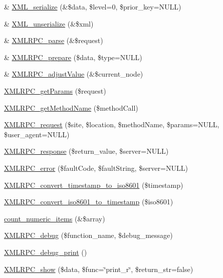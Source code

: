 \begin{CompactItemize}
\item 
\& \hyperlink{xmlrpc_8inc_a1e9b05a06f28fabb86c10129f5890ef}{XML\_\-serialize} (\&\$data, \$level=0, \$prior\_\-key=NULL)
\item 
\& \hyperlink{xmlrpc_8inc_ef8f3de498a12b230d049cdee6a25145}{XML\_\-unserialize} (\&\$xml)
\item 
\& \hyperlink{xmlrpc_8inc_708b2136ca600664d2207a511b3cf3f8}{XMLRPC\_\-parse} (\&\$request)
\item 
\& \hyperlink{xmlrpc_8inc_c13be54b26e0803d8745e4f019dcfd8a}{XMLRPC\_\-prepare} (\$data, \$type=NULL)
\item 
\& \hyperlink{xmlrpc_8inc_d936fe41ae9c3e0b90bd72ffe82a2969}{XMLRPC\_\-adjustValue} (\&\$current\_\-node)
\item 
\hyperlink{xmlrpc_8inc_ce4ea8e1274ca2ee3f51ec5a724f00f3}{XMLRPC\_\-getParams} (\$request)
\item 
\hyperlink{xmlrpc_8inc_70efa062e92a380196ed8053850c0906}{XMLRPC\_\-getMethodName} (\$methodCall)
\item 
\hyperlink{xmlrpc_8inc_3a98b6984b8ca01752d1aa9a267526a3}{XMLRPC\_\-request} (\$site, \$location, \$methodName, \$params=NULL, \$user\_\-agent=NULL)
\item 
\hyperlink{xmlrpc_8inc_c736d378caaccdd0726ea1080d1f526f}{XMLRPC\_\-response} (\$return\_\-value, \$server=NULL)
\item 
\hyperlink{xmlrpc_8inc_0cdc54b1376ccbbe412175c9819a95ac}{XMLRPC\_\-error} (\$faultCode, \$faultString, \$server=NULL)
\item 
\hyperlink{xmlrpc_8inc_4485d809c5d598949d9cfaca42bddf37}{XMLRPC\_\-convert\_\-timestamp\_\-to\_\-iso8601} (\$timestamp)
\item 
\hyperlink{xmlrpc_8inc_1d9c2ef61c9f1fd2723d06d1364ef845}{XMLRPC\_\-convert\_\-iso8601\_\-to\_\-timestamp} (\$iso8601)
\item 
\hyperlink{xmlrpc_8inc_88839ba2c5c835c99f55578c65faa401}{count\_\-numeric\_\-items} (\&\$array)
\item 
\hyperlink{xmlrpc_8inc_e2d2e97a8c1c560f5e96d58d60a02874}{XMLRPC\_\-debug} (\$function\_\-name, \$debug\_\-message)
\item 
\hyperlink{xmlrpc_8inc_8467f85edd385ddf2506b1bd5065a6d7}{XMLRPC\_\-debug\_\-print} ()
\item 
\hyperlink{xmlrpc_8inc_1f60d2672bcb35f5ff908f64931f8d48}{XMLRPC\_\-show} (\$data, \$func=\char`\"{}print\_\-r\char`\"{}, \$return\_\-str=false)
\end{CompactItemize}


